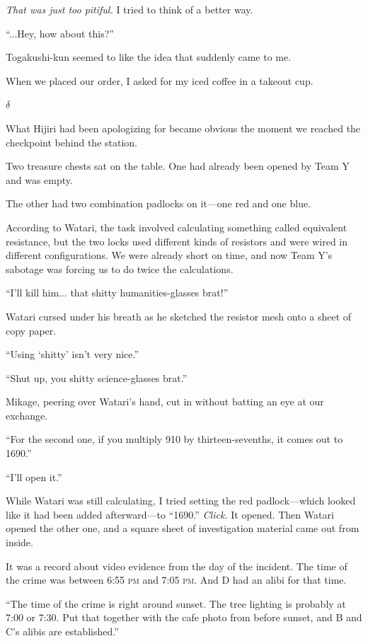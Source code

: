 \documentclass[
    a4paper,
    12pt,
    twoside,
    openany,
    UTF8,
    fontset=windows
]{ctexbook}
\begin{document}
\textit{That was just too pitiful.} I tried to think of a better way.

``...Hey, how about this?''

Togakushi-kun seemed to like the idea that suddenly came to me.

When we placed our order, I asked for my iced coffee in a takeout cup.

$\delta$

What Hijiri had been apologizing for became obvious the moment we reached the checkpoint behind the station.

Two treasure chests sat on the table. One had already been opened by Team Y and was empty.

The other had two combination padlocks on it---one red and one blue.

According to Watari, the task involved calculating something called equivalent resistance, but the two locks used different kinds of resistors and were wired in different configurations. We were already short on time, and now Team Y's sabotage was forcing us to do twice the calculations.

``I'll kill him... that shitty humanities-glasses brat!''

Watari cursed under his breath as he sketched the resistor mesh onto a sheet of copy paper.

``Using `shitty' isn't very nice.''

``Shut up, you shitty science-glasses brat.''

Mikage, peering over Watari's hand, cut in without batting an eye at our exchange.

``For the second one, if you multiply 910 by thirteen-sevenths, it comes out to 1690.''

``I'll open it.''

While Watari was still calculating, I tried setting the red padlock---which looked like it had been added afterward---to ``1690.'' \textit{Click.} It opened. Then Watari opened the other one, and a square sheet of investigation material came out from inside.

It was a record about video evidence from the day of the incident. The time of the crime was between 6:55 \textsc{pm} and 7:05 \textsc{pm}. And D had an alibi for that time.

``The time of the crime is right around sunset. The tree lighting is probably at 7:00 or 7:30. Put that together with the cafe photo from before sunset, and B and C's alibis are established.''
\end{document}
